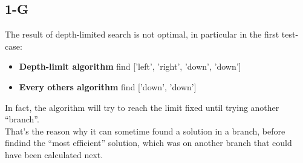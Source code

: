 \documentclass{article}
\begin{document}
        \subsection{1-G}
            The result of depth-limited search is not optimal, in particular in the first test-case:
            \begin{itemize}
                \item \textbf{Depth-limit algorithm} find ['left', 'right', 'down', 'down']
                \item \textbf{Every others algorithm} find ['down', 'down']
            \end{itemize}
            In fact, the algorithm will try to reach the limit fixed until trying another ``branch''.\\
            That's the reason why it can sometime found a solution in a branch, before findind the ``most efficient'' solution, which was on another branch that could have been calculated next.
\end{document}
